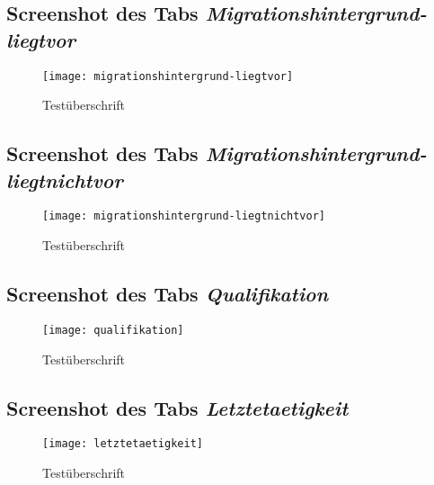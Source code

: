 \begin{landscape}
\subsection{Screenshot des Tabs \textit{Migrationshintergrund-liegtvor}}
\label{section-migrationshintergrund-liegtvor}
\begin{figure}[H]
    \centering
    \caption{Testüberschrift}
    \begin{adjustbox}{width=\linewidth, center}
        \texttt{[image: migrationshintergrund-liegtvor]}
    \end{adjustbox}
\end{figure}

\subsection{Screenshot des Tabs \textit{Migrationshintergrund-liegtnichtvor}}
\label{section-migrationshintergrund-liegtnichtvor}
\begin{figure}[H]
    \centering
    \caption{Testüberschrift}
    \begin{adjustbox}{width=\linewidth, center}
        \texttt{[image: migrationshintergrund-liegtnichtvor]}
    \end{adjustbox}
\end{figure}

\subsection{Screenshot des Tabs \textit{Qualifikation}}
\label{section-qualifikation}
\begin{figure}[H]
    \centering
    \caption{Testüberschrift}
    \begin{adjustbox}{width=\linewidth, center}
        \texttt{[image: qualifikation]}
    \end{adjustbox}
\end{figure}

\subsection{Screenshot des Tabs \textit{Letztetaetigkeit}}
\label{section-letztetaetigkeit}
\begin{figure}[H]
    \centering
    \caption{Testüberschrift}
    \begin{adjustbox}{width=\linewidth, center}
        \texttt{[image: letztetaetigkeit]}
    \end{adjustbox}
\end{figure}


\end{landscape}
